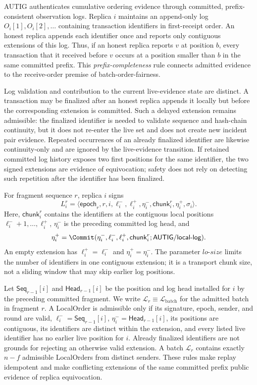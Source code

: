 AUTIG authenticates cumulative ordering evidence through committed,
prefix-consistent observation logs.  Replica $i$ maintains an append-only log
$O_i[1],O_i[2],\ldots$ containing transaction identifiers in first-receipt
order.  An honest replica appends each identifier once and reports only
contiguous extensions of this log.  Thus, if an honest replica reports $v$ at
position $b$, every transaction that it received before $v$ occurs at a
position smaller than $b$ in the same committed prefix.  This
\emph{prefix-completeness} rule connects admitted evidence to the
receive-order premise of batch-order-fairness.

Log validation and contribution to the current live-evidence state are
distinct.  A transaction may be finalized after an honest replica appends it
locally but before the corresponding extension is committed.  Such a delayed
extension remains admissible: the finalized identifier is needed to validate
sequence and hash-chain continuity, but it does not re-enter the live set and
does not create new incident pair evidence.  Repeated occurrences of an
already finalized identifier are likewise continuity-only and are ignored by
the live-evidence transition.  If retained committed log history exposes two
first positions for the same identifier, the two signed extensions are
evidence of equivocation; safety does not rely on detecting such repetition
after the identifier has been finalized.

For fragment sequence $r$, replica $i$ signs
\[
 L_i^r=\langle \mathsf{epoch}_r,r,i,\ell_i^{-},\ell_i^{+},
 \eta_i^{-},\mathsf{chunk}_i^r,\eta_i^{+},\sigma_i\rangle.
\]
Here, $\mathsf{chunk}_i^r$ contains the identifiers at the contiguous local
positions $\ell_i^{-}+1,\ldots,\ell_i^{+}$,
$\eta_i^{-}$ is the preceding committed log head, and
\[
 \eta_i^{+}=\Commit(\eta_i^{-},\ell_i^{-},\ell_i^{+},
              \mathsf{chunk}_i^r;\mathsf{AUTIG/local\mbox{-}log}).
\]
An empty extension has $\ell_i^{+}=\ell_i^{-}$ and
$\eta_i^{+}=\eta_i^{-}$.  The parameter $lo\text{-}size$ limits the number of
identifiers in one contiguous extension; it is a transport chunk size, not a
sliding window that may skip earlier log positions.

Let $\mathsf{Seq}_{r-1}[i]$ and $\mathsf{Head}_{r-1}[i]$ be the position and
log head installed for $i$ by the preceding committed fragment.  We write
$\mathcal L_r\equiv\mathcal L_{\mathrm{batch}}$ for the admitted batch in
fragment $r$.  A LocalOrder
is admissible only if its signature, epoch, sender, and round are valid,
$\ell_i^{-}=\mathsf{Seq}_{r-1}[i]$,
$\eta_i^{-}=\mathsf{Head}_{r-1}[i]$, its positions are contiguous, its
identifiers are distinct within the extension, and every listed live
identifier has no earlier live position for $i$.  Already finalized
identifiers are not grounds for rejecting an otherwise valid extension.  A
batch $\mathcal L_r$ contains exactly $n-f$ admissible LocalOrders from
distinct senders.  These rules make replay idempotent and make conflicting
extensions of the same committed prefix public evidence of replica
equivocation.

